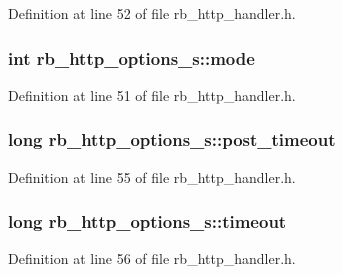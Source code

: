 Definition at line 52 of file rb\+\_\+http\+\_\+handler.\+h.

\hypertarget{structrb__http__options__s_a64f2c587ef7670833a6edf4f41d633c4}{}
\subsubsection[{mode}]{\setlength{\rightskip}{0pt plus 5cm}int rb\+\_\+http\+\_\+options\+\_\+s\+::mode}\label{structrb__http__options__s_a64f2c587ef7670833a6edf4f41d633c4}


Definition at line 51 of file rb\+\_\+http\+\_\+handler.\+h.

\hypertarget{structrb__http__options__s_ade609266d9b7af3df70993f8fa609ac3}{}
\subsubsection[{post\+\_\+timeout}]{\setlength{\rightskip}{0pt plus 5cm}long rb\+\_\+http\+\_\+options\+\_\+s\+::post\+\_\+timeout}\label{structrb__http__options__s_ade609266d9b7af3df70993f8fa609ac3}


Definition at line 55 of file rb\+\_\+http\+\_\+handler.\+h.

\hypertarget{structrb__http__options__s_ad54577110b8dee7499f3c60a4355b0c0}{}
\subsubsection[{timeout}]{\setlength{\rightskip}{0pt plus 5cm}long rb\+\_\+http\+\_\+options\+\_\+s\+::timeout}\label{structrb__http__options__s_ad54577110b8dee7499f3c60a4355b0c0}


Definition at line 56 of file rb\+\_\+http\+\_\+handler.\+h.

\hypertarget{structrb__http__options__s_a4ff0dbf74743aeea85f9c48ab51671cd}{}
